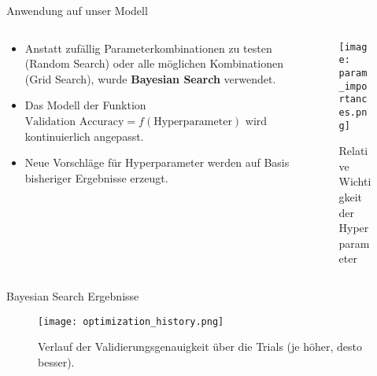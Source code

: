 \begin{frame}{Anwendung auf unser Modell}
\begin{columns}[T,onlytextwidth]
    \begin{column}{0.52\textwidth}
        \begin{itemize}
            \item Anstatt zufällig Parameterkombinationen zu testen (Random Search) oder alle möglichen Kombinationen (Grid Search), wurde \textbf{Bayesian Search} verwendet.
            \item Das Modell der Funktion $\text{Validation Accuracy} = f(\text{Hyperparameter})$ wird kontinuierlich angepasst.
            \item Neue Vorschläge für Hyperparameter werden auf Basis bisheriger Ergebnisse erzeugt.
        \end{itemize}
    \end{column}
    \begin{column}{0.45\textwidth}
        \begin{figure}
            \texttt{[image: param\_importances.png]}
            \caption{Relative Wichtigkeit der Hyperparameter}
        \end{figure}
    \end{column}
\end{columns}
\end{frame}

\begin{frame}{Bayesian Search Ergebnisse}
\begin{figure}
    \centering
    \texttt{[image: optimization\_history.png]}
    \caption{Verlauf der Validierungsgenauigkeit über die Trials (je höher, desto besser).}

\end{figure}
\end{frame}
